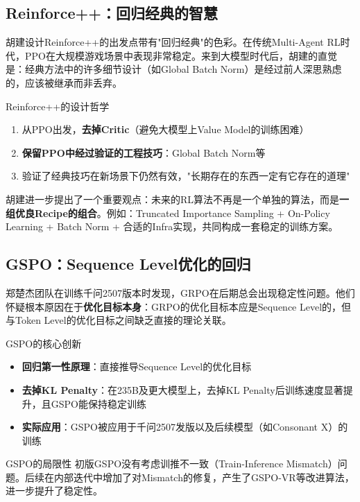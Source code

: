 \documentclass[a4paper]{article}
\begin{document}
\subsection{Reinforce++：回归经典的智慧}

胡建设计Reinforce++的出发点带有"回归经典"的色彩。在传统Multi-Agent RL时代，PPO在大规模游戏场景中表现非常稳定。来到大模型时代后，胡建的直觉是：经典方法中的许多细节设计（如Global Batch Norm）是经过前人深思熟虑的，应该被继承而非丢弃。

\begin{importantbox}{Reinforce++的设计哲学}
\begin{enumerate}
    \item 从PPO出发，\textbf{去掉Critic}（避免大模型上Value Model的训练困难）
    \item \textbf{保留PPO中经过验证的工程技巧}：Global Batch Norm等
    \item 验证了经典技巧在新场景下仍然有效，"长期存在的东西一定有它存在的道理"
\end{enumerate}
\end{importantbox}

胡建进一步提出了一个重要观点：未来的RL算法不再是一个单独的算法，而是\textbf{一组优良Recipe的组合}。例如：Truncated Importance Sampling + On-Policy Learning + Batch Norm + 合适的Infra实现，共同构成一套稳定的训练方案。

\subsection{GSPO：Sequence Level优化的回归}

郑楚杰团队在训练千问2507版本时发现，GRPO在后期总会出现稳定性问题。他们怀疑根本原因在于\textbf{优化目标本身}：GRPO的优化目标本应是Sequence Level的，但与Token Level的优化目标之间缺乏直接的理论关联。

\begin{importantbox}{GSPO的核心创新}
\begin{itemize}
    \item \textbf{回归第一性原理}：直接推导Sequence Level的优化目标
    \item \textbf{去掉KL Penalty}：在235B及更大模型上，去掉KL Penalty后训练速度显著提升，且GSPO能保持稳定训练
    \item \textbf{实际应用}：GSPO被应用于千问2507发版以及后续模型（如Consonant X）的训练
\end{itemize}
\end{importantbox}

\begin{warningbox}{GSPO的局限性}
初版GSPO没有考虑训推不一致（Train-Inference Mismatch）问题。后续在内部迭代中增加了对Mismatch的修复，产生了GSPO-VR等改进算法，进一步提升了稳定性。
\end{warningbox}
\end{document}
